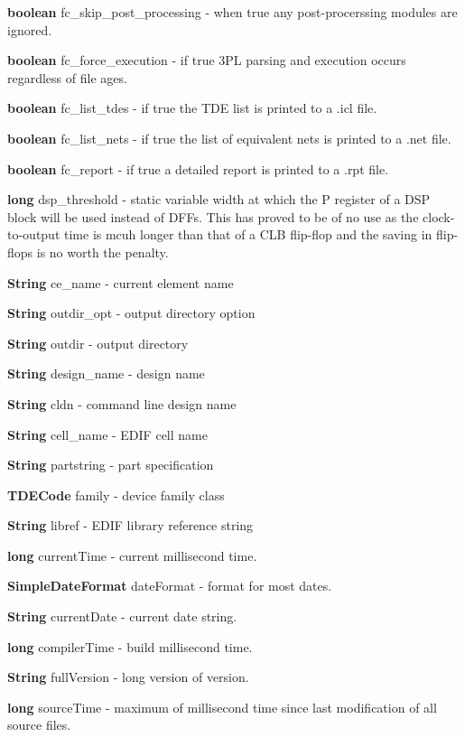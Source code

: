 \documentclass[10pt,a4paper,twoside,fleqn]{book}
\begin{document}
            {\bf boolean} fc\_skip\_post\_processing - when true any post-procerssing modules
            are ignored.

            {\bf boolean} fc\_force\_execution - if true 3PL parsing and execution occurs regardless of
            file ages.

            {\bf boolean} fc\_list\_tdes - if true the TDE list is printed to a .icl file.

            {\bf boolean} fc\_list\_nets - if true the list of equivalent nets is printed to a .net file.

            {\bf boolean} fc\_report - if true a detailed report is printed to a .rpt file.

            {\bf long} dsp\_threshold - static variable width at which the P register
            of a DSP block will be used instead of DFFs. This has proved to be of no
            use as the clock-to-output time is mcuh longer than that of a CLB flip-flop
            and the saving in flip-flops is no worth the penalty.

            {\bf String} ce\_name - current element name

            {\bf String} outdir\_opt - output directory option

            {\bf String} outdir - output directory

            {\bf String} design\_name - design name

            {\bf String} cldn - command line design name

            {\bf String} cell\_name - EDIF cell name

            {\bf String} partstring - part specification

            {\bf TDECode} family - device family class

            {\bf String} libref - EDIF library reference string

            {\bf long} currentTime - current millisecond time.

            {\bf SimpleDateFormat} dateFormat - format for most dates.

            {\bf String} currentDate - current date string.

            {\bf long} compilerTime - build millisecond time.

            {\bf String} fullVersion - long version of version.

            {\bf long} sourceTime - maximum of millisecond time since last modification of all source
            files.
\end{document}
